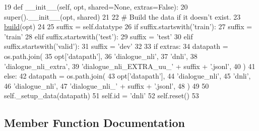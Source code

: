 \begin{DoxyCode}
19     \textcolor{keyword}{def }\_\_init\_\_(self, opt, shared=None, extras=False):
20         super().\_\_init\_\_(opt, shared)
21 
22         \textcolor{comment}{# Build the data if it doesn't exist.}
23         \hyperlink{namespaceparlai_1_1mturk_1_1tasks_1_1talkthewalk_1_1download_a8c0fbb9b6dfe127cb8c1bd6e7c4e33fd}{build}(opt)
24 
25         suffix = self.datatype
26         \textcolor{keywordflow}{if} suffix.startswith(\textcolor{stringliteral}{'train'}):
27             suffix = \textcolor{stringliteral}{'train'}
28         \textcolor{keywordflow}{elif} suffix.startswith(\textcolor{stringliteral}{'test'}):
29             suffix = \textcolor{stringliteral}{'test'}
30         \textcolor{keywordflow}{elif} suffix.startswith(\textcolor{stringliteral}{'valid'}):
31             suffix = \textcolor{stringliteral}{'dev'}
32 
33         \textcolor{keywordflow}{if} extras:
34             datapath = os.path.join(
35                 opt[\textcolor{stringliteral}{'datapath'}],
36                 \textcolor{stringliteral}{'dialogue\_nli'},
37                 \textcolor{stringliteral}{'dnli'},
38                 \textcolor{stringliteral}{'dialogue\_nli\_extra'},
39                 \textcolor{stringliteral}{'dialogue\_nli\_EXTRA\_uu\_'} + suffix + \textcolor{stringliteral}{'.jsonl'},
40             )
41         \textcolor{keywordflow}{else}:
42             datapath = os.path.join(
43                 opt[\textcolor{stringliteral}{'datapath'}],
44                 \textcolor{stringliteral}{'dialogue\_nli'},
45                 \textcolor{stringliteral}{'dnli'},
46                 \textcolor{stringliteral}{'dialogue\_nli'},
47                 \textcolor{stringliteral}{'dialogue\_nli\_'} + suffix + \textcolor{stringliteral}{'.jsonl'},
48             )
49 
50         self.\_setup\_data(datapath)
51         self.id = \textcolor{stringliteral}{'dnli'}
52         self.reset()
53 
\end{DoxyCode}


\subsection{Member Function Documentation}
\mbox{\label{classparlai_1_1tasks_1_1dialogue__nli_1_1agents_1_1DialogueNliTeacher_aa3dfbefa7098aa0336896dd7ac5698b9}} 
